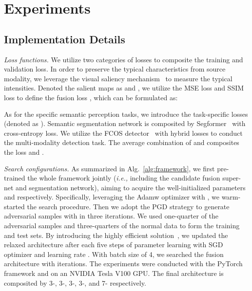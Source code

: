 \documentclass[sigconf]{acmart}
\begin{document}
\section{Experiments}
\subsection{Implementation Details}


\textit{Loss functions.} We utilize two categories of losses to composite the training and validation loss.
In order to preserve the typical characteristics from source modality, we leverage the visual saliency mechanism~\cite{ma20171123} to measure the typical intensities. Denoted the salient maps as  and , we utilize  the MSE loss and SSIM loss to define the fusion loss , which can be formulated as: 

As for the specific semantic perception tasks, we introduce the task-specific losses (denoted as ). Semantic segmentation network is composited by Segformer~\cite{xie2021segformer} with cross-entropy loss. We utilize the FCOS detector~\cite{tian2019fcos} with hybrid losses to conduct the multi-modality detection task. The average combination of  and  composites the loss  and .


\textit{Search configurations.} As summarized in Alg.~\ref{alg:framework}, we first pre-trained the whole framework  jointly (\textit{i.e.,} including the candidate fusion super-net and segmentation network), aiming to acquire the well-initialized parameters  and
 respectively.  Specifically, leveraging the Adamw optimizer with    , we warm-started the search procedure. Then we adopt the PGD strategy to generate adversarial samples with  in three iterations. We used one-quarter of the adversarial samples and three-quarters of the normal data to form the training and test sets. By introducing the highly efficient solution~\cite{liu2022revisiting}, we updated the relaxed architecture  after  each five steps of parameter learning with SGD optimizer and learning rate . With batch size of 4, we searched the fusion architecture with  iterations.
The experiments were conducted with the PyTorch framework and on an NVIDIA Tesla V100 GPU. The final architecture is composited by 3-, 3-, 3-, 3-,  and 7- respectively.
\end{document}
